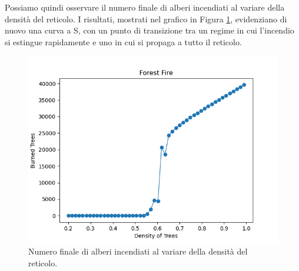 \documentclass{article}
\begin{document}
    Possiamo quindi osservare il numero finale di alberi incendiati al variare della densità del reticolo. I risultati,
    mostrati nel grafico in Figura \ref{fig:forestfire_density}, evidenziano di nuovo una curva a S, con un punto di
    transizione tra un regime in cui l'incendio si estingue rapidamente e uno in cui si propaga a tutto il reticolo.
    \begin{figure}[H]
        \centering
        \includegraphics[width=0.6\linewidth]{../images/forestfire_final}
        \caption{Numero finale di alberi incendiati al variare della densità del reticolo.}
        \label{fig:forestfire_density}
    \end{figure}
\end{document}
